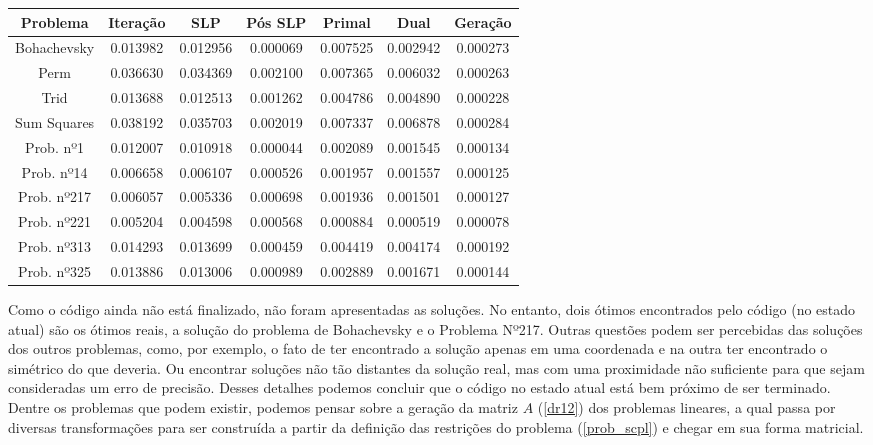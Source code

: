 {
  \begin{center}
    \begin{small}
      \begin{tabular}{||c|c|c|c|c|c|c||}
        \hline
        Problema & Iteração & SLP & Pós SLP & Primal & Dual & Geração \\ [0.5ex] 
        \hline\hline

        Bohachevsky & 0.013982 & 0.012956 & 0.000069 & 0.007525 & 0.002942 & 0.000273 \\
        \hline
        Perm        & 0.036630 & 0.034369 & 0.002100 & 0.007365 & 0.006032 & 0.000263 \\
        \hline
        Trid        & 0.013688 & 0.012513 & 0.001262 & 0.004786 & 0.004890 & 0.000228 \\
        \hline
        Sum Squares & 0.038192 & 0.035703 & 0.002019 & 0.007337 & 0.006878 & 0.000284 \\
        \hline
        Prob. nº1   & 0.012007 & 0.010918 & 0.000044 & 0.002089 & 0.001545 & 0.000134 \\
        \hline
        Prob. nº14  & 0.006658 & 0.006107 & 0.000526 & 0.001957 & 0.001557 & 0.000125 \\
        \hline
        Prob. nº217 & 0.006057 & 0.005336 & 0.000698 & 0.001936 & 0.001501 & 0.000127 \\
        \hline
        Prob. nº221 & 0.005204 & 0.004598 & 0.000568 & 0.000884 & 0.000519 & 0.000078 \\
        \hline
        Prob. nº313 & 0.014293 & 0.013699 & 0.000459 & 0.004419 & 0.004174 & 0.000192 \\
        \hline
        Prob. nº325 & 0.013886 & 0.013006 & 0.000989 & 0.002889 & 0.001671 & 0.000144 \\
        \hline

      \end{tabular}
    \end{small}
  \end{center}
}

Como o código ainda não está finalizado, não foram apresentadas as soluções. No entanto,
dois ótimos encontrados pelo código (no estado atual) são os ótimos reais, a solução do
problema de Bohachevsky e o Problema Nº217. Outras questões podem ser percebidas das
soluções dos outros problemas, como, por exemplo, o fato de ter encontrado a solução
apenas em uma coordenada e na outra ter encontrado o simétrico do que deveria. Ou
encontrar soluções não tão distantes da solução real, mas com uma proximidade não
suficiente para que sejam consideradas um erro de precisão. Desses detalhes podemos
concluir que o código no estado atual está bem próximo de ser terminado. Dentre os
problemas que podem existir, podemos pensar sobre a geração da matriz \(A\) (\ref{dr12})
dos problemas lineares, a qual passa por diversas transformações para ser construída
a partir da definição das restrições do problema (\ref{prob_scpl}) e chegar em sua forma
matricial.



